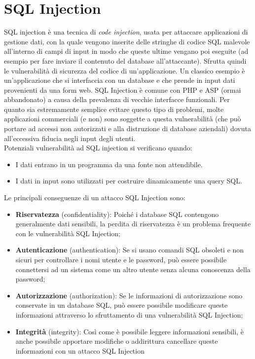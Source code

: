 \chapter{SQL Injection}

SQL injection è una tecnica di \textit{code injection}, usata per attaccare applicazioni di gestione dati, con la quale vengono inserite delle stringhe di codice SQL malevole all'interno di campi di input in modo che queste ultime vengano poi eseguite (ad esempio per fare inviare il contenuto del database all'attaccante).
Sfrutta quindi le vulnerabilità di sicurezza del codice
di un'applicazione. Un classico esempio è un'applicazione che si interfaccia con un database e che prende in input dati provenienti da una form web.
SQL Injection è comune con PHP e ASP (ormai abbandonato) a causa della prevalenza di
vecchie interfacce funzionali. Per quanto sia estremamente semplice evitare questo tipo di problemi,
molte applicazioni commerciali (e non) sono soggette a questa vulnerabilità (che può portare ad accessi non
autorizzati e alla distruzione di database aziendali) dovuta all'eccessiva fiducia negli input degli utenti.\\

Potenziali vulnerabilità ad SQL injection si verificano quando:

\begin{itemize}
    \item I dati entrano in un programma da una fonte non attendibile.
    \item I dati in input sono utilizzati per costruire
          dinamicamente una query SQL.
\end{itemize}

Le principali conseguenze di un attacco SQL Injection sono:

\begin{itemize}
    \item \textbf{Riservatezza} (confidentiality):
          Poiché i database SQL contengono generalmente dati
          sensibili, la perdita di riservatezza è un problema frequente con le
          vulnerabilità SQL
          Injection;
    \item \textbf{Autenticazione} (authentication): Se si usano comandi SQL
          obsoleti e non sicuri per controllare i
          nomi utente e le password, può essere possibile connettersi ad un sistema
          come un
          altro utente senza alcuna conoscenza della password;
    \item \textbf{Autorizzazione} (authorization): Se le informazioni di
          autorizzazione sono conservate
          in un database SQL, può essere possibile modificare queste informazioni
          attraverso
          lo sfruttamento di una vulnerabilità SQL Injection;
    \item \textbf{Integrità} (integrity): Così come è possibile leggere
          informazioni sensibili, è anche
          possibile apportare modifiche o addirittura cancellare queste informazioni
          con un
          attacco SQL Injection
\end{itemize}

